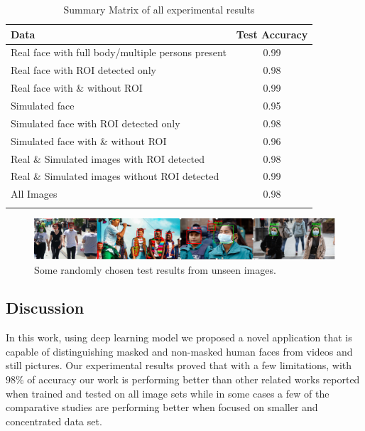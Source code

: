 \documentclass{svproc}
\begin{document}
\begin{table}[]
\centering
\begin{tabular}{lc}
\hline
Data & Test Accuracy \\
\hline
Real face with full body/multiple persons present & 0.99 \\
Real face with ROI detected only                       & 0.98 \\
Real face with \& without ROI                      & 0.99 \\
Simulated face                  & 0.95 \\
Simulated face with ROI detected  only            & 0.98 \\
Simulated face with \& without ROI       & 0.96 \\
Real \& Simulated images with ROI detected           & 0.98 \\
Real \& Simulated images without ROI detected                 & 0.99 \\
All Images                         & 0.98 \\
\hline \\
\end{tabular}
\caption{Summary Matrix of all experimental results}
\label{expResult}
\end{table}

\begin{figure}[!ht]
\includegraphics[width=1\textwidth]{test_image.PNG}
\centering
\caption{Some randomly chosen test results from unseen images.}
\label{testresult}
\end{figure}

\subsection{Discussion}

In this work, using deep learning model we proposed a novel application that is capable of distinguishing masked and non-masked human faces from videos and still pictures. Our experimental results proved that with a few limitations, with $98\%$ of accuracy our work is performing better than other related works reported when trained and tested on all image sets while in some cases a few of the comparative studies are performing better when focused on smaller and concentrated data set. 
\end{document}
